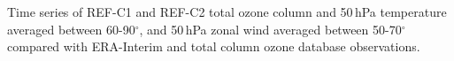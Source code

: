 \label{fig:time_series}
Time series of REF-C1 and REF-C2 total ozone column and 50\,hPa temperature averaged between 60-90$^{\circ}$, and 50\,hPa zonal wind averaged between 50-70$^{\circ}$ compared with ERA-Interim and total column ozone database observations.